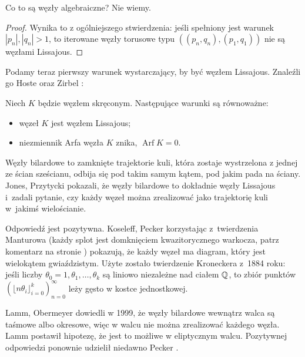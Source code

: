 Co to są węzły algebraiczne?
Nie wiemy.

\begin{proof}
    Wynika to z ogólniejszego stwierdzenia: jeśli spełniony jest warunek $|p_n|, |q_n| > 1$, to iterowane węzły torusowe typu $((p_n, q_n), (p_1, q_1))$ nie są węzłami Lissajous.
\end{proof}

Podamy teraz pierwszy warunek wystarczający, by być węzłem Lissajous.
Znaleźli go Hoste oraz Zirbel \cite{zirbel2006}:
%
%

\begin{proposition}
%
%
    Niech $K$ będzie węzłem skręconym.
    Następujące warunki są równoważne:
    \begin{itemize}
        \item węzeł $K$ jest węzłem Lissajous;
        \item niezmiennik Arfa węzła $K$ znika, $\operatorname{Arf} K = 0$.
    \end{itemize}
\end{proposition}

Węzły bilardowe to zamknięte trajektorie kuli, która zostaje wystrzelona z jednej ze ścian sześcianu, odbija się pod takim samym kątem, pod jakim pada na ściany.
%
Jones, Przytycki \cite{jones1998} pokazali, że węzły bilardowe to dokładnie węzły Lissajous i~zadali pytanie, czy każdy węzeł można zrealizować jako trajektorię kuli w~jakimś wielościanie.
%
%

Odpowiedź jest pozytywna.
Koseleff, Pecker \cite{koseleff2014} korzystając z~twierdzenia Manturowa
%
%
%
(każdy splot jest domknięciem kwazitorycznego warkocza, patrz komentarz na stronie \pageref{thm:alexander})
pokazują, że każdy węzeł ma diagram, który jest wielokątem gwiaździstym.
Użyte zostało twierdzenie Kroneckera z~1884 roku: jeśli liczby $\theta_0 = 1, \theta_1, \ldots, \theta_k$ są liniowo niezależne nad ciałem $\mathbb Q$, to zbiór punktów $(\lfloor n\theta_i \rfloor_{i=0}^k)_{n=0}^\infty$ leży gęsto w kostce jednostkowej.

Lamm, Obermeyer \cite{obermeyer1999} dowiedli w 1999, że węzły bilardowe wewnątrz walca są taśmowe albo okresowe, więc w walcu nie można zrealizować każdego węzła.
%
%
%
%
Lamm postawił hipotezę, że jest to możliwe w eliptycznym walcu.
Pozytywnej odpowiedzi ponownie udzielił niedawno Pecker \cite{pecker2012}.
%



